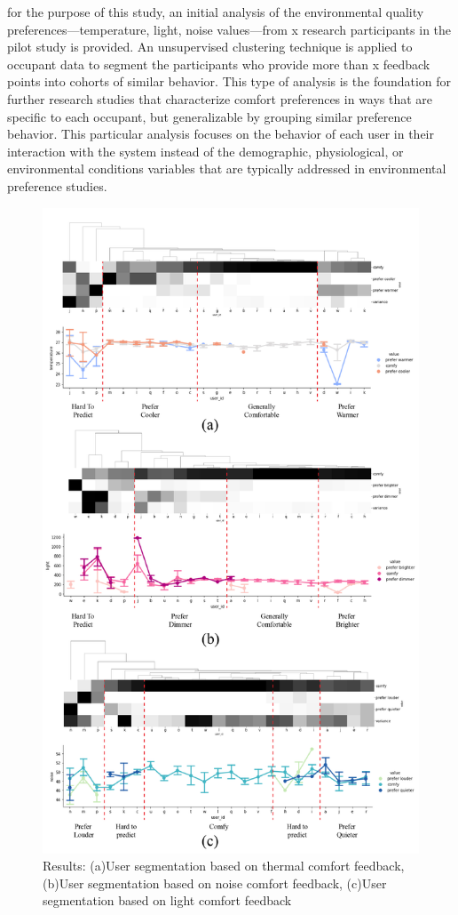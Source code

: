 \documentclass[]{interact}
\theoremstyle{plain}%
\theoremstyle{definition}
\theoremstyle{remark}
\begin{document}
for the purpose of this study, an initial analysis of the environmental quality preferences---temperature, light, noise values---from x research participants in the pilot study is provided. An unsupervised clustering technique is applied to occupant data to segment the participants who provide more than x feedback points into cohorts of similar behavior. This type of analysis is the foundation for further research studies that characterize comfort preferences in ways that are specific to each occupant, but generalizable by grouping similar preference behavior. This particular analysis focuses on the behavior of each user in their interaction with the system instead of the demographic, physiological, or environmental conditions variables that are typically addressed in environmental preference studies. 

\begin{figure}[H]
\centering
\includegraphics[scale=0.9]{figures/results-01.jpg}
\caption{Results: (a)User segmentation based on thermal comfort feedback, (b)User segmentation based on noise comfort feedback, (c)User segmentation based on light comfort feedback} 
\label{results}
\end{figure}
\end{document}
